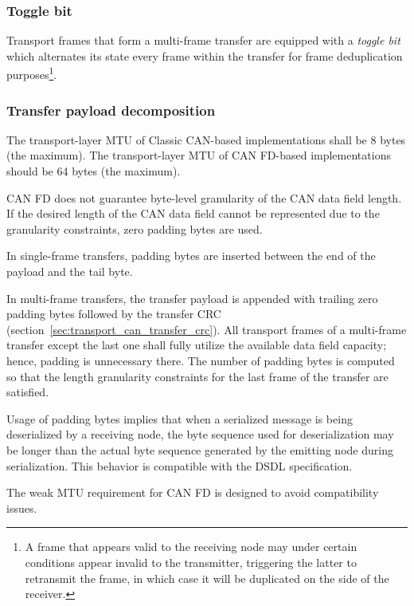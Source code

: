 \subsubsection{Toggle bit}\label{sec:transport_can_toggle_bit}

Transport frames that form a multi-frame transfer are equipped with a \emph{toggle bit}
which alternates its state every frame within the transfer for frame deduplication purposes\footnote{%
    A frame that appears valid to the receiving node may under certain conditions appear invalid to the transmitter,
    triggering the latter to retransmit the frame, in which case it will be duplicated on the side of the receiver.
}.

\subsubsection{Transfer payload decomposition}

The transport-layer MTU of Classic CAN-based implementations shall be 8 bytes (the maximum).
The transport-layer MTU of CAN FD-based implementations should be 64 bytes (the maximum).

CAN FD does not guarantee byte-level granularity of the CAN data field length.
If the desired length of the CAN data field cannot be represented due to the granularity constraints,
zero padding bytes are used.

In single-frame transfers, padding bytes are inserted between the end of the payload and the tail byte.

In multi-frame transfers, the transfer payload is appended with trailing zero padding bytes
followed by the transfer CRC (section~\ref{sec:transport_can_transfer_crc}).
All transport frames of a multi-frame transfer except the last one shall fully utilize the available
data field capacity; hence, padding is unnecessary there.
The number of padding bytes is computed so that the length granularity constraints
for the last frame of the transfer are satisfied.

\begin{remark}
    Usage of padding bytes implies that when a serialized message is being deserialized by a receiving node,
    the byte sequence used for deserialization may be longer than the actual byte sequence generated by the
    emitting node during serialization.
    This behavior is compatible with the DSDL specification.

    The weak MTU requirement for CAN FD is designed to avoid compatibility issues.
\end{remark}

